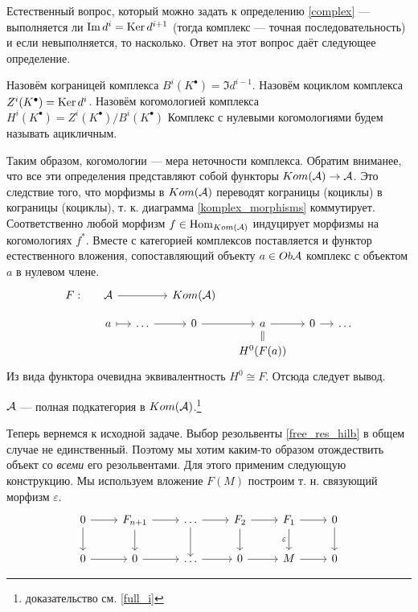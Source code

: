 \documentclass[../main.tex]{subfiles}
\begin{document}
Естественный вопрос, который можно задать к определению \ref{complex} --- выполняется ли $\mathop{\mathrm{Im}}\nolimits d^i = \mathop{\mathrm{Ker}}\nolimits d^{i+1}$ (тогда комплекс --- точная последовательность) и если невыполняется, то насколько. Ответ на этот вопрос даёт следующее определение.
\begin{to_def}
Назовём кограницей комплекса $B^i(K^\bullet) = \Im d^{i-1}$.
Назовём коциклом комплекса $Z^i(K^\bullet) = \mathop{\mathrm{Ker}}\nolimits d^{i}$.
Назовём когомологией комплекса $H^i(K^\bullet) = Z^i(K^\bullet)/B^i(K^\bullet)$
Комплекс с нулевыми когомологиями будем называть ацикличным.
\end{to_def}
Таким образом, когомологии --- мера неточности комплекса. Обратим вниманее, что все эти определения представляют собой функторы $Kom(\mathcal{A})\to \mathcal{A}$. Это следствие того, что морфизмы в $Kom(\mathcal{A})$ переводят кограницы (коциклы) в кограницы (коциклы), т. к. диаграмма \eqref{komplex_morphisms} коммутирует. Соответственно любой морфизм $f\in \operatorname{Hom}_{Kom(\mathcal{A})}$ индуцирует морфизмы на когомологиях $f^*$.
Вместе с категорией комплексов поставляется и функтор естественного вложения, сопоставляющий объекту $a\in Ob\mathcal{A}$ комплекс с объектом $a$ в нулевом члене.
\begin{equation*}
    \begin{tikzcd}[sep=small]
	{F:} & \A & {} & {Kom(\A)} \\
	{} & a & \ldots & 0 & a & 0 & \ldots \\
	&&&& {H^0(F(a))}
	\arrow[from=2-3, to=2-4]
	\arrow[from=2-4, to=2-5]
	\arrow[from=2-5, to=2-6]
	\arrow[from=2-6, to=2-7]
	\arrow[Rightarrow, no head, from=2-5, to=3-5]
	\arrow[maps to, from=2-2, to=2-3]
	\arrow[from=1-2, to=1-4]
\end{tikzcd}
\end{equation*}
Из вида функтора очевидна эквивалентность $H^0\cong F$. Отсюда следует вывод.
\begin{to_suj}
$\mathcal{A}$ --- полная подкатегория в $Kom(\mathcal{A})$.\footnote{доказательство см. \ref{full_i}}
\end{to_suj}
Теперь вернемся к исходной задаче. Выбор резольвенты \eqref{free_res_hilb} в общем случае не единственный. Поэтому мы хотим каким-то образом отождествить объект со \emph{всеми} его резольвентами. Для этого применим следующую конструкцию. Мы используем вложение $F(M)$ построим т. н. связующий морфизм $\varepsilon$.
\begin{equation*}
    \begin{tikzcd}
	0 & {F_{n+1}} & \ldots & {F_2} & {F_1} & 0 \\
	0 & 0 & \ldots & 0 & M & 0
	\arrow[from=1-6, to=2-6]
	\arrow["\varepsilon"', from=1-5, to=2-5]
	\arrow[from=1-4, to=2-4]
	\arrow[from=1-3, to=2-3]
	\arrow[from=1-2, to=2-2]
	\arrow[from=1-1, to=2-1]
	\arrow[from=1-1, to=1-2]
	\arrow[from=1-2, to=1-3]
	\arrow[from=1-3, to=1-4]
	\arrow[from=1-4, to=1-5]
	\arrow[from=1-5, to=1-6]
	\arrow[from=2-5, to=2-6]
	\arrow[from=2-4, to=2-5]
	\arrow[from=2-3, to=2-4]
	\arrow[from=2-2, to=2-3]
	\arrow[from=2-1, to=2-2]
\end{tikzcd}
\end{equation*}
\end{document}
